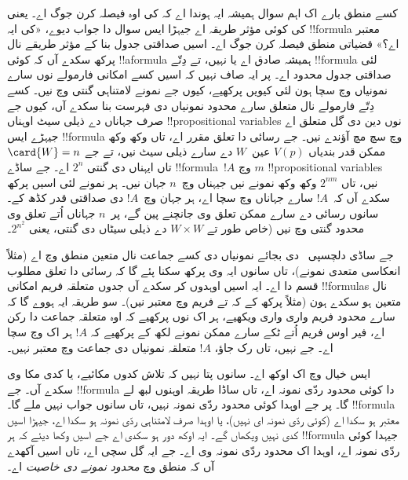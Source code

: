 \documentclass[../../../include/open-logic-section]{subfiles}
\begin{document}


کسے منطق بارے اک اہم سوال ہمیشہ ایہ ہوندا اے کہ کی اوہ فیصلہ کرن جوگ اے۔ یعنی کی کوئی مؤثر طریقہ اے جیہڑا ایس سوال دا جواب دیوے، «کی ایہ !!{formula} معتبر اے؟» قضیاتی منطق فیصلہ کرن جوگ اے۔ اسیں صداقتی جدول بنا کے مؤثر طریقے نال پرکھ سکدے آں کہ کوئی !!a{formula} ہمیشہ صادق اے یا نہیں، تے دِتّے !!{formula} لئی صداقتی جدول محدود اے۔ پر ایہ صاف نہیں کہ اسیں کسے امکانی فارمولے نوں سارے نمونیاں وچ سچا ہون لئی کیویں پرکھیے، کیوں جے نمونے لامتناہی گنتی وچ نیں۔ کسے دِتّے فارمولے نال متعلق سارے محدود نمونیاں دی فہرست بنا سکدے آں، کیوں جے صرف جہاناں دے ذیلی سیٹ اوہناں !!{propositional variable}s نوں دین دی گل متعلق اے جیہڑے ایس !!{formula} وچ سچ مچ آؤندے نیں۔ جے رسائی دا تعلق مقرر اے، تاں وکھ وکھ ممکن قدر بندیاں $V(p)$ عین~$W$ دے سارے ذیلی سیٹ نیں، تے جے $\card{W} = n$ تاں ایہناں دی گنتی $2^n$ اے۔ جے ساڈے !!{formula}~$!A$ وچ $m$ !!{propositional
  variable}s نیں، تاں $2^{nm}$ وکھ وکھ نمونے نیں جیہناں وچ~$n$ جہان نیں۔ ہر نمونے لئی اسیں پرکھ سکدے آں کہ~$!A$ سارے جہاناں وچ سچا اے، ہر جہان وچ~$!A$ دی صداقتی قدر کڈھ کے۔ سانوں رسائی دے سارے ممکن تعلق وی جانچنے پین گے، پر~$n$ جہاناں اُتے تعلق وی محدود گنتی وچ نیں (خاص طور تے $W \times W$ دے ذیلی سیٹاں دی گنتی، یعنی $2^{n^2}$۔

جے ساڈی دلچسپی~ دی بجائے نمونیاں دی کسے جماعت نال متعین منطق وچ اے (مثلاً انعکاسی متعدی نمونے)، تاں سانوں ایہ وی پرکھ سکنا پئے گا کہ رسائی دا تعلق مطلوب قسم دا اے۔ ایہ اسیں اوہدوں کر سکدے آں جدوں متعلقہ فریم امکانی !!{formula}s نال متعین ہو سکدے ہون (مثلاً پرکھ کے کہ  تے  فریم وچ معتبر نیں)۔ سو طریقہ ایہ ہووے گا کہ سارے محدود فریم واری واری ویکھیے، ہر اک نوں پرکھیے کہ اوہ متعلقہ جماعت دا رکن اے، فیر اوس فریم اُتے ٹکے سارے ممکن نمونے لکھ کے پرکھیے کہ $!A$ ہر اک وچ سچا اے۔ جے نہیں، تاں رک جاؤ، $!A$ متعلقہ نمونیاں دی جماعت وچ معتبر نہیں۔

ایس خیال وچ اک اوکھ اے۔ سانوں پتا نہیں کہ تلاش کدوں مکائیے، یا کدی مکا وی سکدے آں۔ جے !!{formula} دا کوئی محدود ردّی نمونہ اے، تاں ساڈا طریقہ اوہنوں لبھ لے گا۔ پر جے اوہدا کوئی محدود ردّی نمونہ نہیں، تاں سانوں جواب نہیں ملے گا۔ !!{formula} معتبر ہو سکدا اے (کوئی ردّی نمونہ ای نہیں)، یا اوہدا صرف لامتناہی ردّی نمونہ ہو سکدا اے، جیہڑا اسیں کدی نہیں ویکھاں گے۔ ایہ اوکھ دور ہو سکدی اے جے اسیں وکھا دیئے کہ ہر !!{formula} جیہدا کوئی ردّی نمونہ اے، اوہدا اک محدود ردّی نمونہ وی اے۔ جے ایہ گل سچی اے، تاں اسیں آکھدے آں کہ منطق وچ \emph{محدود نمونے دی خاصیت} اے۔
\end{document}
